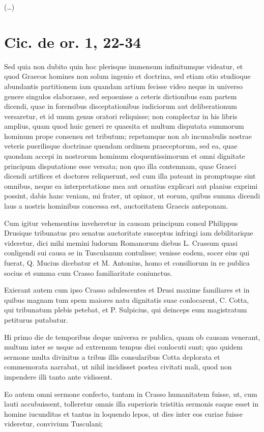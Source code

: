 (\dots)

\section*{Cic. de or. 1, 22-34}

Sed quia non dubito quin hoc plerisque immensum infinitumque videatur, et quod Graecos homines non solum ingenio et doctrina, sed etiam otio studioque abundantis partitionem iam quandam artium fecisse video neque in universo genere singulos elaborasse, sed seposuisse a ceteris dictionibus eam partem dicendi, quae in forensibus disceptationibus iudiciorum aut deliberationum versaretur, et id unum genus oratori reliquisse; non complectar in his libris amplius, quam quod huic generi re quaesita et multum disputata summorum hominum prope consensu est tributum; repetamque non ab incunabulis nostrae veteris puerilisque doctrinae quendam ordinem praeceptorum, sed ea, quae quondam accepi in nostrorum hominum eloquentissimorum et omni dignitate principum disputatione esse versata; non quo illa contemnam, quae Graeci dicendi artifices et doctores reliquerunt, sed cum illa pateant in promptuque sint omnibus, neque ea interpretatione mea aut ornatius explicari aut planius exprimi possint, dabis hanc veniam, mi frater, ut opinor, ut eorum, quibus summa dicendi laus a nostris hominibus concessa est, auctoritatem Graecis anteponam.

Cum igitur vehementius inveheretur in causam principum consul Philippus Drusique tribunatus pro senatus auctoritate susceptus infringi iam debilitarique videretur, dici mihi memini ludorum Romanorum diebus L. Crassum quasi conligendi sui causa se in Tusculanum contulisse; venisse eodem, socer eius qui fuerat, Q. Mucius dicebatur et M. Antonius, homo et consiliorum in re publica socius et summa cum Crasso familiaritate coniunctus.

Exierant autem cum ipso Crasso adulescentes et Drusi maxime familiares et in quibus magnam tum spem maiores natu dignitatis suae conlocarent, C. Cotta, qui tribunatum plebis petebat, et P. Sulpicius, qui deinceps eum magistratum petiturus putabatur.

Hi primo die de temporibus deque universa re publica, quam ob causam venerant, multum inter se usque ad extremum tempus diei conlocuti sunt; quo quidem sermone multa divinitus a tribus illis consularibus Cotta deplorata et commemorata narrabat, ut nihil incidisset postea civitati mali, quod non impendere illi tanto ante vidissent.

Eo autem omni sermone confecto, tantam in Crasso humanitatem fuisse, ut, cum lauti accubuissent, tolleretur omnis illa superioris tristitia sermonis eaque esset in homine iucunditas et tantus in loquendo lepos, ut dies inter eos curiae fuisse videretur, convivium Tusculani;

